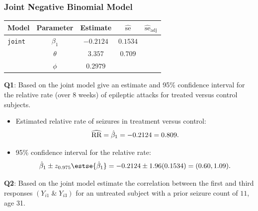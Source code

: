 \documentclass[oneside]{book}\usepackage[]{graphicx}\usepackage[svgnames]{xcolor}
\let\exp\relax%
\newcommand{\RR}{\text{RR}}%
\begin{document}
\subsubsection*{Joint Negative Binomial Model}
\begin{table}[H]
      \centering
      \begin{tabular}{lcccc}
            Model          & Parameter   & Estimate    & $ \widehat{\text{se}} $ & $ \widehat{\text{se}}_{\text{adj}} $ \\
            \midrule
            \texttt{joint} & $ \beta_1 $ & $ -0.2124 $ & $ 0.1534 $              &                                      \\
                           & $ \theta $  & $3.357$     & $ 0.709 $                                                      \\
                           & $ \phi $    & $0.2979$                                                                     \\
            \bottomrule
      \end{tabular}
\end{table}
\begin{Example}{}
      \textbf{Q1}: Based on the joint model give an estimate and 95\% confidence interval for the
      relative rate (over 8 weeks) of epileptic attacks for treated versus control subjects.
\end{Example}
\begin{itemize}
      \item Estimated relative rate of seizures in treatment versus control:
            \[ \widehat{\RR}=\exp{\hat{\beta}_1}=\exp{-0.2124}=0.809. \]
      \item 95\% confidence interval for the relative rate:
            \[ \exp{\hat{\beta}_1\pm z_{0.975}\estse{\hat{\beta}_1}}=\exp{-0.2124\pm 1.96(0.1534)}=(0.60,1.09). \]
\end{itemize}
\begin{Example}{}
      \textbf{Q2}: Based on the joint model estimate the correlation between the first and third
      responses $(Y_{i1}\;\&\;Y_{i3})$ for an untreated subject with a prior seizure count of $11$, age 31.
\end{Example}
\end{document}
